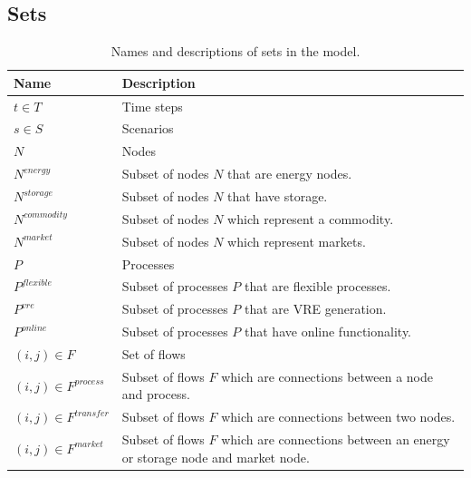 \documentclass{article}
\begin{document}
\subsection{Sets}
\renewcommand{\arraystretch}{1.5}
\begin{table}[H]
\small
\caption{Names and descriptions of sets in the model.}
\label{tbl:sets}
\centering
\begin{tabular}{ l | p{10cm} }

Name    &   Description  \\
\midrule
$t \in T$   &   Time steps  \\
$s \in S$   &   Scenarios  \\

$N$   &   Nodes  \\
$N^{energy}$   &   Subset of nodes $N$ that are energy nodes.  \\ 
$N^{storage}$   &   Subset of nodes $N$ that have storage.  \\ 
$N^{commodity}$     &   Subset of nodes $N$ which represent a commodity. \\
$N^{market}$  &   Subset of nodes $N$ which represent markets.  \\

$P$          &   Processes  \\
$P^{flexible}$  &   Subset of processes $P$ that are flexible processes. \\ 
$P^{vre}$     &   Subset of processes $P$ that are VRE generation. \\ 
$P^{online}$  &  Subset of processes $P$ that have online functionality.  \\ %

$(i,j) \in F $ & Set of flows  \\
$(i,j) \in F^{process} $ & Subset of flows $F$ which are connections between a node and process. \\
$(i,j) \in F^{transfer} $ & Subset of flows $F$ which are connections between two nodes. \\
$(i,j) \in F^{market} $ & Subset of flows $F$ which are connections between an energy or storage node and market node. \\


\end{tabular}
\end{table}



\end{document}
